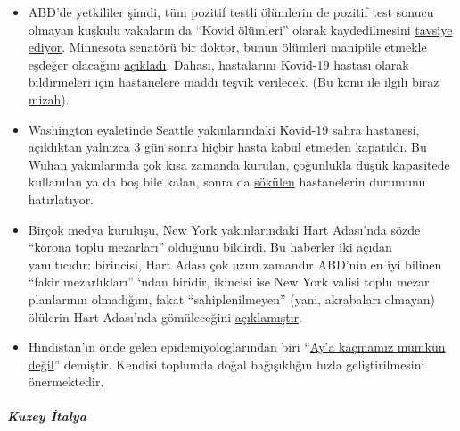 \begin{itemize}
\tightlist
\item
  ABD'de yetkililer şimdi, tüm pozitif testli ölümlerin de pozitif test
  sonucu olmayan kuşkulu vakaların da ``Kovid ölümleri'' olarak
  kaydedilmesini
  \href{https://nypost.com/2020/04/07/feds-classify-all-coronavirus-patient-deaths-as-covid-19-deaths/?link=TD_mansionglobal_new_mansion_global.11147f181987fd93}{tavsiye
  ediyor}. Minnesota senatörü bir doktor, bunun ölümleri manipüle
  etmekle eşdeğer olacağını
  \href{https://www.valleynewslive.com/content/misc/Sen-Dr-Jensens-Shocking-Admission-About-Coronavirus-569458361.html}{açıkladı}.
  Dahası, hastalarını Kovid-19 hastası olarak bildirmeleri için
  hastanelere maddi teşvik verilecek. (Bu konu ile ilgili biraz
  \href{https://swprs.files.wordpress.com/2020/04/cv-2019-2020.jpg}{mizah}).
\item
  Washington eyaletinde Seattle yakınlarındaki Kovid-19 sahra hastanesi,
  açıldıktan yalnızca 3 gün sonra
  \href{https://www.yahoo.com/news/armys-seattle-field-hospital-closes-165646379.html}{hiçbir
  hasta kabul etmeden kapatıldı}. Bu Wuhan yakınlarında çok kısa zamanda
  kurulan, çoğunlukla düşük kapasitede kullanılan ya da boş bile kalan,
  sonra da
  \href{https://www.theguardian.com/world/2020/feb/12/what-chinas-empty-new-coronavirus-hospitals-say-about-its-secretive-system}{sökülen}
  hastanelerin durumunu hatırlatıyor.
\item
  Birçok medya kuruluşu, New York yakınlarındaki Hart Adası'nda sözde
  ``korona toplu mezarları'' olduğunu bildirdi. Bu haberler iki açıdan
  yanıltıcıdır: birincisi, Hart Adası çok uzun zamandır ABD'nin en iyi
  bilinen ``fakir mezarlıkları'' `ndan biridir, ikincisi ise New York
  valisi toplu mezar planlarının olmadığını, fakat ``sahiplenilmeyen''
  (yani, akrabaları olmayan) ölülerin Hart Adası'nda gömüleceğini
  \href{https://www.independent.co.uk/news/world/americas/new-york-coronavirus-cases-burials-bodies-covid-19-hart-island-a9459956.html}{açıklamıştır}.
\item
  Hindistan'ın önde gelen epidemiyologlarından biri
  ``\href{https://www.business-standard.com/article/current-affairs/we-cannot-run-away-to-the-moon-need-to-develop-herd-immunity-dr-muliyil-120040601232_1.html}{Ay'a
  kaçmamız mümkün değil}'' demiştir. Kendisi toplumda doğal bağışıklığın
  hızla geliştirilmesini önermektedir.
\end{itemize}

\hypertarget{kuzey-italya}{%
\subparagraph{\texorpdfstring{\textbf{Kuzey
İtalya}}{Kuzey İtalya}}\label{kuzey-italya}}

